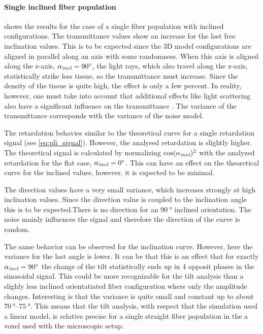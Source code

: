 \paragraph{Single inclined fiber population}
 shows the results for the case of a single fiber population with inclined configurations.
The transmittance values show an increase for the last free inclination values.
This is to be expected since the 3D model configurations are aligned in parallel along an axis with some randomness.
When this axis is aligned along the z-axis, \ie{} $\textnormal{$\alpha_{\mathit{incl}}$}=\SI{90}{\degree}$, the light rays, which also travel along the z-axis, statistically strike less tissue, so the transmittance must increase.
Since the density of the tissue is quite high, the effect is only a few percent.
In reality, however, one must take into account that additional effects like light scattering also have a significant influence on the transmittance \cite{Menzel2021}.
The variance of the transmittance corresponds with the variance of the noise model.
\par
%
The retardation behavies similar to the theoretical curve for a single retardation signal (see \cref{eq:pli_signal}).
However, the analysed retardation is slightly higher.
The theoretical signal is calculated by normalizing $\cos(\textnormal{$\alpha_{\mathit{incl}}$})^2$ with the analyzed retardation for the flat case, \ie{} $\textnormal{$\alpha_{\mathit{incl}}$} = \SI{0}{\degree}$.
This can have an effect on the theoretical curve for the inclined values, however, it is expected to be minimal.
\par
%
The direction values have a very small variance, which increases strongly at high inclination values.
Since the direction value is coupled to the inclination angle this is to be expected.There is no direction for an $\SI{90}{\degree}$ inclined orientation.
The noise mainly influences the signal and therefore the direction of the  curve is random.
\par
%
The same behavior can be observed for the inclination curve.
However, here the variance for the last angle is lower.
It can be that this is an effect that for exactly $\textnormal{$\alpha_{\mathit{incl}}$}=\SI{90}{\degree}$ the change of the tilt statistically ends up in 4 opposit phases in the sinosoidal signal.
This could be more recognizable for the tilt analysis than a slighly less inclined orientatiated fiber configuration where only the amplitude changes.
Interesting is that the variance is quite small and constant up to about $\SIrange{70}{75}{\degree}$.
This means that the tilt analysis, with respect that the simulation used a linear model, is relative precise for a single straight fiber population in the a voxel used with the microscopic setup.
